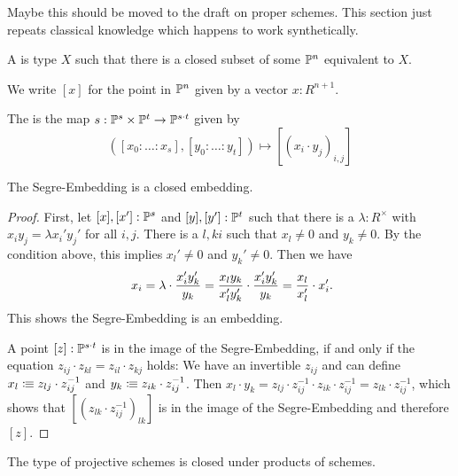 
Maybe this should be moved to the draft on proper schemes.
This section just repeats classical knowledge which happens to work synthetically.

\begin{definition}
  A  is type $X$ such that there is a closed subset of some $\mathbb{P}^n$ equivalent to $X$.
\end{definition}

We write $[x]$ for the point in $\mathbb{P}^n$ given by a vector $x:R^{n+1}$.

\begin{definition}
  The  is the map $s:\mathbb{P}^s\times \mathbb{P}^t\to \mathbb{P}^{s\cdot t}$ given by
  \[
    ([x_0:\dots : x_s],[y_0:\dots :y_t])\mapsto [(x_i\cdot y_j)_{i,j}]
  \]
\end{definition}

\begin{proposition}
  The Segre-Embedding is a closed embedding.
\end{proposition}

\begin{proof}
  First, let $[x],[x']:\mathbb{P}^{s}$ and $[y],[y']:\mathbb{P}^{t}$ such that there is a $\lambda:R^\times$ with $x_iy_j=\lambda x_i'y_j'$ for all $i,j$.
  There is a $l,ki$ such that $x_l\neq 0$ and $y_k\neq 0$.
  By the condition above, this implies $x_l'\neq 0$ and $y_k'\neq 0$.
  Then we have 
  \[
    x_i = \lambda \cdot \frac{x_i'y_k'}{y_k} = \frac{x_ly_k}{x_l'y_k'} \cdot \frac{x_i'y_k'}{y_k} = \frac{x_l}{x_l'} \cdot x_i'
     \rlap{.}
   \]
   This shows the Segre-Embedding is an embedding.

   A point $[z]:\mathbb{P}^{s\cdot t}$ is in the image of the Segre-Embedding, if and only if the equation $z_{ij}\cdot z_{kl}=z_{il}\cdot z_{kj}$ holds:
   We have an invertible $z_{ij}$ and can define $x_{l}\vcentcolon\mspace{-1.2mu}\equiv z_{lj}\cdot z_{ij}^{-1}$ and $y_{k}\vcentcolon\mspace{-1.2mu}\equiv z_{ik}\cdot z_{ij}^{-1}$.
   Then $x_l\cdot y_k= z_{lj}\cdot z_{ij}^{-1} \cdot z_{ik}\cdot z_{ij}^{-1}=z_{lk}\cdot z_{ij}^{-1}$,
   which shows that $[(z_{lk}\cdot z_{ij}^{-1})_{lk}]$ is in the image of the Segre-Embedding and therefore $[z]$.
 \end{proof}

 \begin{theorem}
   The type of projective schemes is closed under products of schemes.
 \end{theorem}